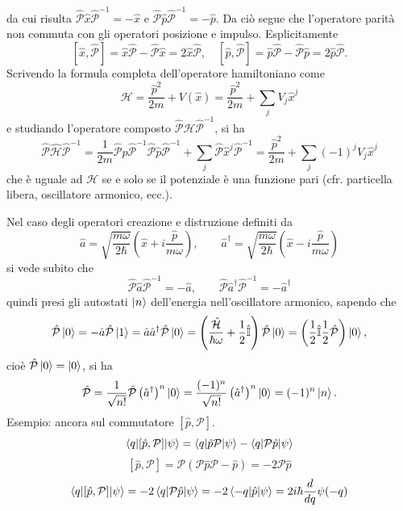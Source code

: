 da cui risulta \( \hat{\mathcal{P}} \hat{x} \hat{\mathcal{P}}^{-1} = -\hat{x} \) e \( \hat{\mathcal{P}} \hat{p} \hat{\mathcal{P}}^{-1} = -\hat{p} \). Da ciò segue che l'operatore parità non commuta con gli operatori posizione e impulso. Esplicitamente
\[
[\hat{x}, \hat{\mathcal{P}}] = \hat{x} \hat{\mathcal{P}} - \hat{\mathcal{P}} \hat{x} = 2 \hat{x} \hat{\mathcal{P}}, \quad [\hat{p}, \hat{\mathcal{P}}] = \hat{p} \hat{\mathcal{P}} - \hat{\mathcal{P}} \hat{p} = 2 \hat{p} \hat{\mathcal{P}}.
\]
Scrivendo la formula completa dell'operatore hamiltoniano come 
\[
\mathcal{H} = \frac{\hat{p}^2}{2m} + V(\hat{x}) = \frac{\hat{p}^2}{2m} + \sum_j V_j \hat{x}^j
\]
e studiando l'operatore composto \( \hat{\mathcal{P}} \mathcal{H} \hat{\mathcal{P}}^{-1} \), si ha
\[
\hat{\mathcal{P}} \hat{\mathcal{H}} \hat{\mathcal{P}}^{-1} = \frac{1}{2m} \hat{\mathcal{P}} \hat{p} \hat{\mathcal{P}}^{-1} \hat{\mathcal{P}} \hat{p} \hat{\mathcal{P}}^{-1} + \sum_j \hat{\mathcal{P}} \hat{x}^j \hat{\mathcal{P}}^{-1} = \frac{\hat{p}^2}{2m} + \sum_j (-1)^j V_j \hat{x}^j
\]
che è uguale ad \( \mathcal{H} \) se e solo se il potenziale è una funzione pari (cfr. particella libera, oscillatore armonico, ecc.).

\bigskip
\noindent
Nel caso degli operatori creazione e distruzione definiti da 
\[
\hat{a} = \sqrt{\frac{m\omega}{2\hbar}} \left( \hat{x} + i \frac{\hat{p}}{m\omega} \right), \qquad \hat{a}^\dag = \sqrt{\frac{m\omega}{2\hbar}} \left( \hat{x} - i \frac{\hat{p}}{m\omega} \right)
\]
si vede subito che 
\[
\hat{\mathcal{P}} \hat{a} \hat{\mathcal{P}}^{-1} = -\hat{a}, \qquad \hat{\mathcal{P}} \hat{a}^\dag \hat{\mathcal{P}}^{-1} = -\hat{a}^\dag
\]
quindi presi gli autostati \( \ket{n} \) dell'energia nell'oscillatore armonico, sapendo che 
\[
\hat{\mathcal{P}} \ket{0} = -\hat{a} \hat{\mathcal{P}} \ket{1} = \hat{a} \hat{a}^\dag \hat{\mathcal{P}} \ket{0} = \left( \frac{\hat{\mathcal{H}}}{\hbar \omega} + \frac{1}{2} \hat{\mathbb{I}} \right) \hat{\mathcal{P}} \ket{0} = \left( \frac{1}{2} \hat{\mathbb{I}} \frac{1}{2} \hat{\mathcal{P}} \right) \ket{0},
\]
cioè \( \hat{\mathcal{P}} \ket{0} = \ket{0} \), si ha
\[
\hat{\mathcal{P}} = \frac{1}{\sqrt{n!}} \hat{\mathcal{P}} \left( \hat{a}^\dag \right)^n \ket{0} = \frac{(-1)^n}{\sqrt{n!}} \left( \hat{a}^\dag \right)^n \ket{0} = (-1)^n \ket{n}.
\]
Esempio: ancora sul commutatore \( [\hat{p}, \mathcal{P}] \).
\[
\braket{q|[\hat{p}, \mathcal{P}]|\psi} = \braket{q|\hat{p} \mathcal{P}|\psi} - \braket{q|\mathcal{P} \hat{p}|\psi}
\]
\[
[\hat{p}, \mathcal{P}] = \mathcal{P} (\mathcal{P}\hat{p}\mathcal{P} - \hat{p}) = -2 \mathcal{P}\hat{p}
\]
\[
\braket{q|[\hat{p}, \mathcal{P}]|\psi} = -2 \braket{q|\mathcal{P}\hat{p}|\psi} = -2\braket{-q|\hat{p}|\psi} = 2i \hbar \frac{d}{dq} \psi(-q)
\]